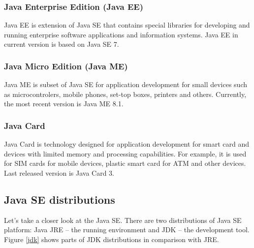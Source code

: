 \subsubsection{Java Enterprise Edition (Java EE)}
Java EE is extension of Java SE that contains special libraries for developing and running enterprise software applications and information systems. Java EE in current version is based on Java SE 7.

\subsubsection{Java Micro Edition (Java ME)}
Java ME is subset of Java SE for application development for small devices such as microcontrolers, mobile phones, set-top boxes, printers and others. Currently, the most recent version is Java ME 8.1.

\subsubsection{Java Card}
Java Card is technology designed for application development for smart card and devices with limited memory and processing capabilities. For example, it is used for SIM cards for mobile devices, plastic smart card for ATM and other devices. Last released version is Java Card 3.

\subsection{Java SE distributions}
Let's take a closer look at the Java SE. There are two distributions of Java SE platform: Java JRE -- the running environment and JDK -- the development tool. Figure \ref{jdk} shows parts of JDK distributions in comparison with JRE.

